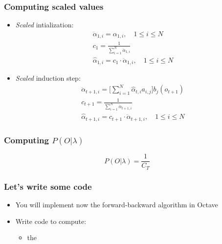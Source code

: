 \begin{frame}
  \frametitle{Computing scaled values}
  \begin{itemize}
  \item \emph{Scaled} intialization:
    \begin{align}
      \ddot{\alpha}_{1,i} = \alpha_{1,i},\quad 1 \le i \le N \\
      c_1 = \frac{1}{\displaystyle\sum_{i=1}^{N} \ddot{\alpha}_{1,i}} \\
      \hat{\alpha}_{1,i} = c_1 \cdot \ddot{\alpha}_{1,i}, \quad 1 \le
      i \le N
    \end{align}
    \pause
    \vspace*{-.5em}
  \item \emph{Scaled} induction step:
    \begin{align}
      \ddot{\alpha}_{t+1,i} = \Big[
      \displaystyle\sum_{i=1}^{N}\hat{\alpha}_{t,i}a_{i,j}\Big]
      b_{j}(o_{t+1}) \\
      c_{t+1} = \frac{1}{\displaystyle\sum_{i=1}^{N} \ddot{\alpha}_{t+1,i}} \\
      \hat{\alpha}_{t+1,i} = c_{t+1} \cdot \ddot{\alpha}_{t+1,i},
      \quad 1 \le i \le N
    \end{align}
  \end{itemize}

\end{frame}

\begin{frame}
  \frametitle{Computing $P(O | \lambda)$}
  \begin{equation}
    \label{eq:scaled-probability}
    P(O \vert \lambda) = \frac{1}{C_T}
  \end{equation}
\end{frame}


\begin{frame}
  \frametitle{Let's write some code}
  \begin{itemize}
  \item You will implement now the forward-backward algorithm in
    Octave
  \item Write code to compute:
    \begin{itemize}
    \item the
    \end{itemize}

  \end{itemize}
\end{frame}
